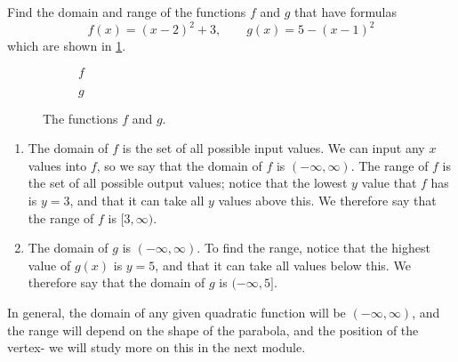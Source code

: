 \begin{myexample}
Find the domain and range of the functions $f$ and $g$ that have formulas
\[
	f(x) = (x-2)^2 +3, \qquad g(x) = 5-(x-1)^2
\]  
which are shown in \cref{fig:quadraticrange}.
\end{myexample}
\begin{figure}[!h]
	\begin{subfigure}{.5\textwidth}
		\centering
		\caption{$f$}
	\end{subfigure}%
	\begin{subfigure}{.5\textwidth}
		\centering
		\caption{$g$}
	\end{subfigure}
	\caption{The functions $f$ and $g$.}
	\label{fig:quadraticrange}
\end{figure}

\begin{myProof}
	\begin{enumerate}
		\item The domain of $f$ is the set of all possible input values. We can input any $x$ values into $f$, so we say
		that the domain of $f$ is $(-\infty, \infty)$. The range of $f$ is the set of all possible output values; notice
		that the lowest $y$ value that $f$ has is $y=3$, and that it can take all $y$ values above this. We therefore say
		that the range of $f$ is $[3,\infty)$.
			\item The domain of $g$ is $(-\infty, \infty)$. To find the range, notice that the highest value of $g(x)$ is $y=5$, and
		that it can take all values below this. We therefore say that the domain of $g$ is $(-\infty, 5]$.
	\end{enumerate} 
	In general, the domain of any given quadratic function will be $(-\infty, \infty)$, and the range will depend on the shape
	of the parabola, and the position of the \gls{vertex}- we will study more on this in the next module.
	{}
\end{myProof} 

